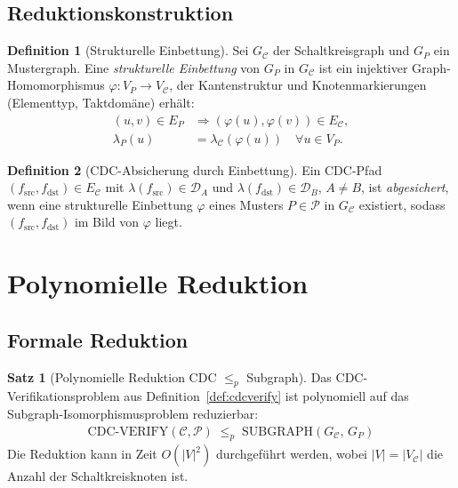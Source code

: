 ﻿\documentclass[a4paper,12pt]{article}
\theoremstyle{definition}
\newtheorem{definition}{Definition}
\newtheorem{satz}{Satz}
\begin{document}
	\subsection{Reduktionskonstruktion}
	
	\begin{definition}[Strukturelle Einbettung]
		Sei $G_{\mathcal{C}}$ der Schaltkreisgraph und $G_P$ ein Mustergraph.
		Eine \emph{strukturelle Einbettung} von $G_P$ in $G_{\mathcal{C}}$ ist ein
		injektiver Graph-Homomorphismus $\varphi: V_P \to V_{\mathcal{C}}$, der
		Kantenstruktur und Knotenmarkierungen (Elementtyp, Taktdom\"ane) erhält:
		\begin{align}
			(u,v) \in E_P &\Rightarrow (\varphi(u), \varphi(v)) \in E_{\mathcal{C}}, \\
			\lambda_P(u)   &= \lambda_{\mathcal{C}}(\varphi(u)) \quad \forall u \in V_P.
		\end{align}
	\end{definition}
	
	\begin{definition}[CDC-Absicherung durch Einbettung]
		Ein CDC-Pfad $(f_{\mathrm{src}}, f_{\mathrm{dst}}) \in E_{\mathcal{C}}$ mit
		$\lambda(f_{\mathrm{src}}) \in \mathcal{D}_A$ und $\lambda(f_{\mathrm{dst}}) \in \mathcal{D}_B$,
		$A \neq B$, ist \emph{abgesichert}, wenn eine strukturelle Einbettung
		$\varphi$ eines Musters $P \in \mathcal{P}$ in $G_{\mathcal{C}}$ existiert,
		sodass $(f_{\mathrm{src}}, f_{\mathrm{dst}})$ im Bild von $\varphi$ liegt.
	\end{definition}
	
	\section{Polynomielle Reduktion}
	
	\subsection{Formale Reduktion}
	
	\begin{satz}[Polynomielle Reduktion CDC $\leq_p$ Subgraph]
		\label{satz:reduktion}
		Das CDC-Verifikationsproblem aus Definition~\ref{def:cdcverify} ist
		polynomiell auf das Subgraph-Isomorphismusproblem reduzierbar:
		\begin{align*}
		\mathrm{CDC\text{-}VERIFY}(\mathcal{C}, \mathcal{P}) \;\leq_p\;
		\mathrm{SUBGRAPH}(G_{\mathcal{C}},\, G_P)
		\end{align*}
		Die Reduktion kann in Zeit $O(|V|^2)$ durchgeführt werden, wobei
		$|V| = |V_{\mathcal{C}}|$ die Anzahl der Schaltkreisknoten ist.
	\end{satz}
	
\end{document}
